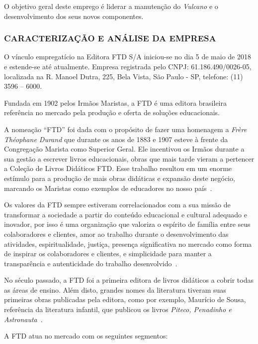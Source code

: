 \documentclass[
  12pt,            %
  openany,
  oneside,
  a4paper,         %
  english,      %
  brazil
]{article}
\numberwithin{figure}{section}
\numberwithin{table}{section}
\begin{document}
O objetivo geral deste emprego é liderar a manutenção do \textit{Vulcano} e o desenvolvimento dos seus novos componentes.


\subsubsection{CARACTERIZAÇÃO E ANÁLISE DA EMPRESA}


O vínculo empregatício na Editora FTD S/A iniciou-se no dia 5 de maio de 2018 e estende-se até atualmente. Empresa registrada pelo CNPJ: 61.186.490/0026-05, localizada na R. Manoel Dutra, 225, Bela Vista, São Paulo - SP, telefone: (11) 3596 – 6000.

Fundada em 1902 pelos Irmãos Maristas, a FTD é uma editora brasileira referência no mercado pela produção e oferta de soluções educacionais.

A nomeação ``FTD'' foi dada com o propósito de fazer uma homenagem a \textit{Frère Théophane Durand} que durante os anos de 1883 e 1907 esteve à frente da Congregação Marista como Superior Geral. Ele incentivou os Irmãos durante a sua gestão a escrever livros educacionais, obras que mais tarde vieram a pertencer a Coleção de Livros Didáticos FTD. Esse trabalho resultou em um enorme estímulo para a produção de mais obras didáticas e expansão deste negócio, marcando os Maristas como exemplos de educadores no nosso país~\cite{site_ftd}.

Os valores da FTD sempre estiveram correlacionados com a sua missão de transformar a sociedade a partir do conteúdo educacional e cultural adequado e inovador, por isso é uma organização que valoriza o espírito de família entre seus colaboradores e clientes, amor ao trabalho durante o desenvolvimento das atividades, espiritualidade, justiça, presença significativa no mercado como forma de inspirar os colaboradores e clientes, e simplicidade para manter a transparência e autenticidade do trabalho desenvolvido~\cite{site_ftd}.

No século passado, a FTD foi a primeira editora de livros didáticos a cobrir todas as áreas de ensino. Além disto, grandes nomes da literatura tiveram suas primeiras obras publicadas pela editora, como por exemplo, Maurício de Sousa, referência da literatura infantil, que publicou os livros \textit{Piteco, Penadinho e Astronauta}~\cite{site_ftd}.

A FTD atua no mercado com os seguintes segmentos:
\end{document}
